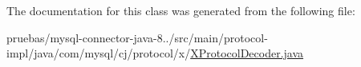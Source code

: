 The documentation for this class was generated from the following file\+:\begin{DoxyCompactItemize}
\item 
pruebas/mysql-\/connector-\/java-\/8../src/main/protocol-\/impl/java/com/mysql/cj/protocol/x/\mbox{\hyperlink{_x_protocol_decoder_8java}{X\+Protocol\+Decoder.\+java}}\end{DoxyCompactItemize}
